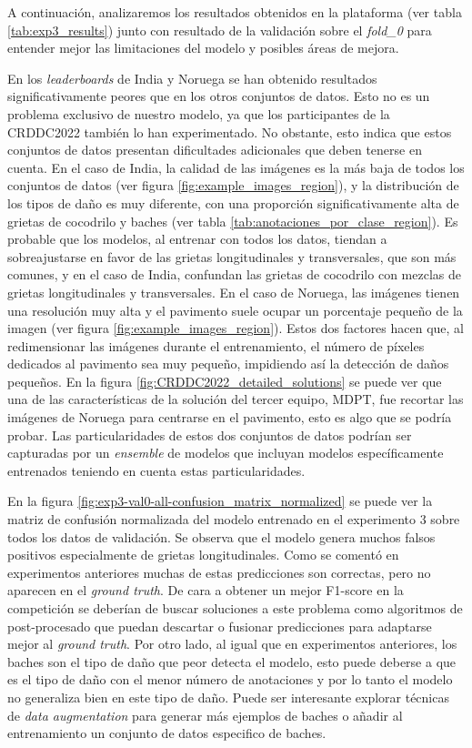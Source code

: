 A continuación, analizaremos los resultados obtenidos en la plataforma (ver tabla \ref{tab:exp3_results}) junto con resultado de la validación sobre el \textit{fold\_0} para entender mejor las limitaciones del modelo y posibles áreas de mejora.

En los \textit{leaderboards} de India y Noruega se han obtenido resultados significativamente peores que en los otros conjuntos de datos. Esto no es un problema exclusivo de nuestro modelo, ya que los participantes de la CRDDC2022 también lo han experimentado. No obstante, esto indica que estos conjuntos de datos presentan dificultades adicionales que deben tenerse en cuenta. En el caso de India, la calidad de las imágenes es la más baja de todos los conjuntos de datos (ver figura \ref{fig:example_images_region}), y la distribución de los tipos de daño es muy diferente, con una proporción significativamente alta de grietas de cocodrilo y baches (ver tabla \ref{tab:anotaciones_por_clase_region}). Es probable que los modelos, al entrenar con todos los datos, tiendan a sobreajustarse en favor de las grietas longitudinales y transversales, que son más comunes, y en el caso de India, confundan las grietas de cocodrilo con mezclas de grietas longitudinales y transversales. En el caso de Noruega, las imágenes tienen una resolución muy alta y el pavimento suele ocupar un porcentaje pequeño de la imagen (ver figura \ref{fig:example_images_region}). Estos dos factores hacen que, al redimensionar las imágenes durante el entrenamiento, el número de píxeles dedicados al pavimento sea muy pequeño, impidiendo así la detección de daños pequeños. En la figura \ref{fig:CRDDC2022_detailed_solutions} se puede ver que una de las características de la solución del tercer equipo, MDPT, fue recortar las imágenes de Noruega para centrarse en el pavimento, esto es algo que se podría probar. Las particularidades de estos dos conjuntos de datos podrían ser capturadas por un \textit{ensemble} de modelos que incluyan modelos específicamente entrenados teniendo en cuenta estas particularidades.

En la figura \ref{fig:exp3-val0-all-confusion_matrix_normalized} se puede ver la matriz de confusión normalizada del modelo entrenado en el experimento 3 sobre todos los datos de validación. Se observa que el modelo genera muchos falsos positivos especialmente de grietas longitudinales. Como se comentó en experimentos anteriores muchas de estas predicciones son correctas, pero no aparecen en el \textit{ground truth}. De cara a obtener un mejor F1-score en la competición se deberían de buscar soluciones a este problema como algoritmos de post-procesado que puedan descartar o fusionar predicciones para adaptarse mejor al \textit{ground truth}. Por otro lado, al igual que en experimentos anteriores, los baches son el tipo de daño que peor detecta el modelo, esto puede deberse a que es el tipo de daño con el menor número de anotaciones y por lo tanto el modelo no generaliza bien en este tipo de daño. Puede ser interesante explorar técnicas de \textit{data augmentation} para generar más ejemplos de baches o añadir al entrenamiento un conjunto de datos especifico de baches.


